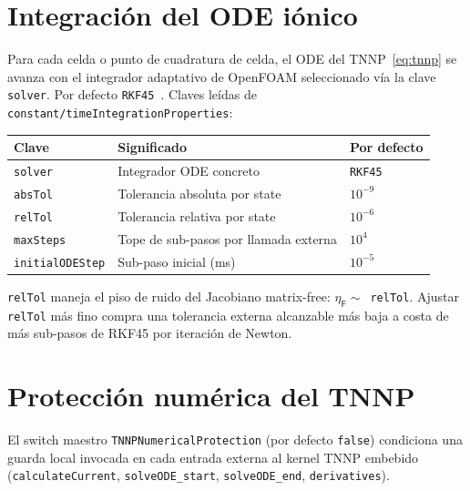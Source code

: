 \documentclass[11pt,a4paper]{article}
\newcommand{\code}[1]{\texttt{\small #1}}
\newcommand{\Fres}{\mathsf{F}}
\begin{document}
\section{Integración del ODE iónico}

Para cada celda o punto de cuadratura de celda, el ODE del TNNP~\eqref{eq:tnnp} se
avanza con el integrador adaptativo de OpenFOAM seleccionado vía la clave
\code{solver}. Por defecto \code{RKF45}~\cite{hairer2}. Claves leídas de
\code{constant/timeIntegrationProperties}:

\begin{center}
\begin{tabular}{@{}lll@{}}
\toprule
Clave & Significado & Por defecto \\
\midrule
\code{solver} & Integrador ODE concreto & \code{RKF45} \\
\code{absTol} & Tolerancia absoluta por state & $10^{-9}$ \\
\code{relTol} & Tolerancia relativa por state & $10^{-6}$ \\
\code{maxSteps} & Tope de sub-pasos por llamada externa & $10^{4}$ \\
\code{initialODEStep} & Sub-paso inicial (ms) & $10^{-5}$ \\
\bottomrule
\end{tabular}
\end{center}

\code{relTol} maneja el piso de ruido del Jacobiano matrix-free:
$\eta_{\Fres} \sim $~\code{relTol}. Ajustar \code{relTol} más fino compra una
tolerancia externa alcanzable más baja a costa de más sub-pasos de RKF45 por
iteración de Newton.

\section{Protección numérica del TNNP}

El switch maestro \code{TNNPNumericalProtection} (por defecto \code{false})
condiciona una guarda local invocada en cada entrada externa al kernel TNNP embebido
(\code{calculateCurrent}, \code{solveODE\_start}, \code{solveODE\_end},
\code{derivatives}).
\end{document}
